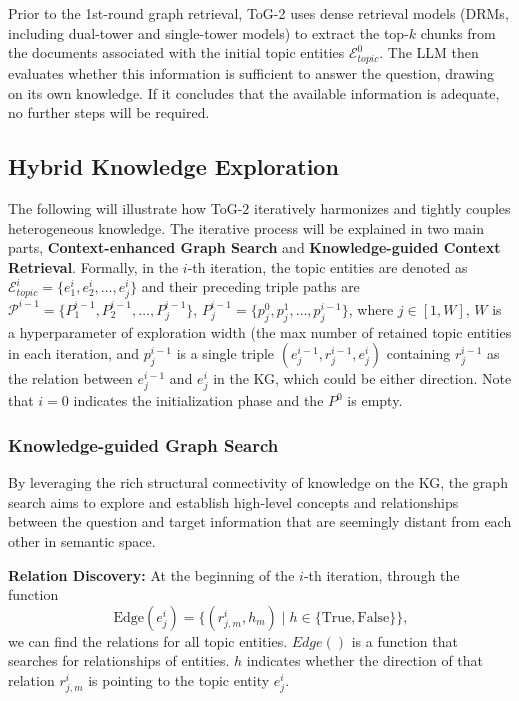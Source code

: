 \documentclass{article} %
\begin{document}
Prior to the 1st-round graph retrieval, ToG-2 uses dense retrieval models (DRMs, including dual-tower and single-tower models) to extract the top-$k$ chunks from the documents associated with the initial topic entities $\mathcal{E}_{topic}^0$. The LLM then evaluates whether this information is sufficient to answer the question, drawing on its own knowledge. If it concludes that the available information is adequate, no further steps will be required.

\subsection{Hybrid Knowledge Exploration}
The following will illustrate how ToG-$2$ iteratively harmonizes and tightly couples heterogeneous knowledge. The iterative process will be explained in two main parts, \textbf{Context-enhanced Graph Search} and \textbf{Knowledge-guided Context Retrieval}. Formally, in the $i$-th iteration, the topic entities are denoted as $\mathcal{E}_{topic}^{i} = \{ e_1^{i}, e_2^{i}, \ldots, e_j^{i}\}$ and their preceding triple paths are $\mathcal{P}^{i-1} = \{ P_1^{i-1}, P_2^{i-1}, \ldots, P_j^{i-1} \}$, $P_j^{i-1} = \{ p_j^0, p_j^1, \ldots, p_j^{i-1} \}$, where $j \in [1, W]$, $W$ is a hyperparameter of exploration width (the max number of retained topic entities in each iteration, and $p_j^{i-1}$ is a single triple $(e_j^{i-1}, r_j^{i-1}, e_j^{i})$ containing $r_j^{i-1}$ as the relation between $e_j^{i-1}$ and $e_j^{i}$ in the KG, which could be either direction. Note that $i = 0$ indicates the initialization phase and the $P^{0}$ is empty.

\subsubsection{Knowledge-guided Graph Search}

By leveraging the rich structural connectivity of knowledge on the KG, the graph search aims to explore and establish high-level concepts and relationships between the question and target information that are seemingly distant from each other in semantic space. 

\textbf{Relation Discovery:} At the beginning of the $i$-th iteration, through the function 
\begin{equation}~\label{eq1}
\text{Edge}(e_j^{i}) = \{ (r_{j,m}^i, h_m) \mid h \in \{ \text{True}, \text{False} \} \},
\end{equation}
we can find the relations for all topic entities. $Edge()$ is a function that searches for relationships of entities. $h$ indicates whether the direction of that relation $r_{j,m}^{i}$ is pointing to the topic entity $e_j^{i}$. 
\end{document}
